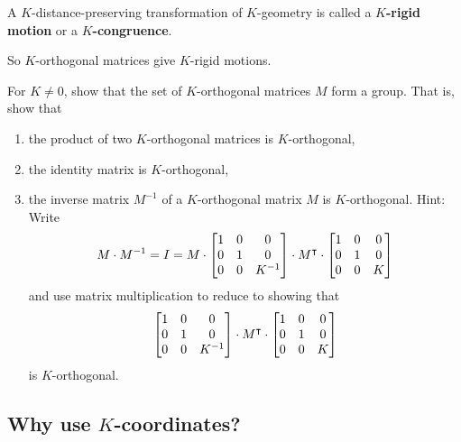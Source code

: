 \documentclass{ximera}
\begin{document}
\begin{definition}
A $K$-distance-preserving transformation of $K$-geometry is called a
$K$\textbf{-rigid motion} or a $K$\textbf{-congruence}.
\end{definition}

So $K$-orthogonal matrices give $K$-rigid motions.

\begin{problem}
For $K\neq0$, show that the set of $K$-orthogonal matrices $M$ form a group.
That is, show that
\begin{enumerate}
\item the product of two $K$-orthogonal matrices is $K$-orthogonal,

\item the identity matrix is $K$-orthogonal,

\item the inverse matrix $M^{-1}$ of a $K$-orthogonal matrix $M$ is $K$-orthogonal.
Hint: Write%
\[
M\cdot M^{-1}=I=M\cdot\begin{bmatrix}
1 & 0 & 0\\
0 & 1 & 0\\
0 & 0 & K^{-1}%
\end{bmatrix}  \cdot M^\transpose\cdot\begin{bmatrix}
1 & 0 & 0\\
0 & 1 & 0\\
0 & 0 & K
\end{bmatrix}
\]
and use matrix multiplication to reduce to showing that
\[
\begin{bmatrix}
1 & 0 & 0\\
0 & 1 & 0\\
0 & 0 & K^{-1}%
\end{bmatrix}  \cdot M^\transpose\cdot\begin{bmatrix}
1 & 0 & 0\\
0 & 1 & 0\\
0 & 0 & K
\end{bmatrix}
\]
is $K$-orthogonal.
\end{enumerate}
\end{problem}

\subsection*{Why use $K$-coordinates?}
\end{document}
